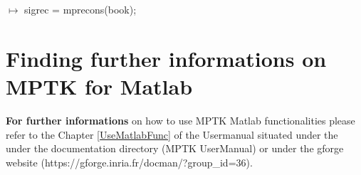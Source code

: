 \vspace{0.2 cm}

\noindent $\mapsto$ sigrec = mprecons(book);

\section{Finding further informations on MPTK for Matlab}

\textbf{For further informations} on how to use MPTK Matlab functionalities please refer to the Chapter \ref{UseMatlabFunc} of the Usermanual situated under the  under the documentation directory (MPTK 
UserManual) or under the gforge website (https://gforge.inria.fr/docman/?group\_id=36).